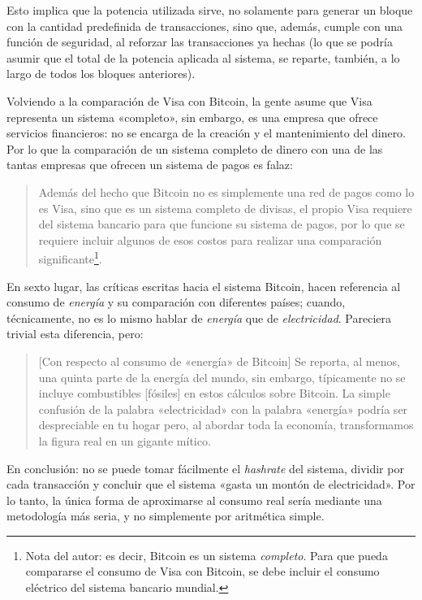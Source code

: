 \documentclass[12pt,a4paper,twoside]{book}
\begin{document}
Esto implica que la potencia utilizada sirve, no solamente para generar un bloque con la cantidad predefinida de transacciones, sino que, además, cumple con una función de seguridad, al reforzar las transacciones ya hechas (lo que se podría asumir que el total de la potencia aplicada al sistema, se reparte, también, a lo largo de todos los bloques anteriores).

Volviendo a la comparación de Visa con Bitcoin, la gente asume que Visa representa un sistema «completo», sin embargo, es una empresa que ofrece servicios financieros: no se encarga de la creación y el mantenimiento del dinero. Por lo que la comparación de un sistema completo de dinero con una de las tantas empresas que ofrecen un sistema de pagos es falaz:

\begin{quotation}
Además del hecho que Bitcoin no es simplemente una red de pagos como lo es Visa, sino que es un sistema completo de divisas, el propio Visa requiere del sistema bancario para que funcione su sistema de pagos, por lo que se requiere incluir algunos de esos costos para realizar una comparación significante\footnote{Nota del autor: es decir, Bitcoin es un sistema \textit{completo}. Para que pueda compararse el consumo de Visa con Bitcoin, se debe incluir el consumo eléctrico del sistema bancario mundial.}. \cite{bitcoin:visa}
\end{quotation}

En sexto lugar, las críticas escritas hacia el sistema Bitcoin, hacen referencia al consumo de \textit{energía} y su comparación con diferentes países; cuando, técnicamente, no es lo mismo hablar de \textit{energía} que de \textit{electricidad}. Pareciera trivial esta diferencia, pero:

\begin{quotation}
[Con respecto al consumo de «energía» de Bitcoin] Se reporta, al menos, una quinta parte de la energía del mundo, sin embargo, típicamente no se incluye combustibles [fósiles] en estos cálculos sobre Bitcoin. La simple confusión de la palabra «electricidad» con la palabra «energía» podría ser despreciable en tu hogar pero, al abordar toda la economía, transformamos la figura real en un gigante mítico. \cite{bitcoin:energia}
\end{quotation}

En conclusión: no se puede tomar fácilmente el \textit{hashrate} del sistema, dividir por cada transacción y concluir que el sistema «gasta un montón de electricidad». Por lo tanto, la única forma de aproximarse al consumo real sería mediante una metodología más seria, y no simplemente por aritmética simple.
\end{document}
